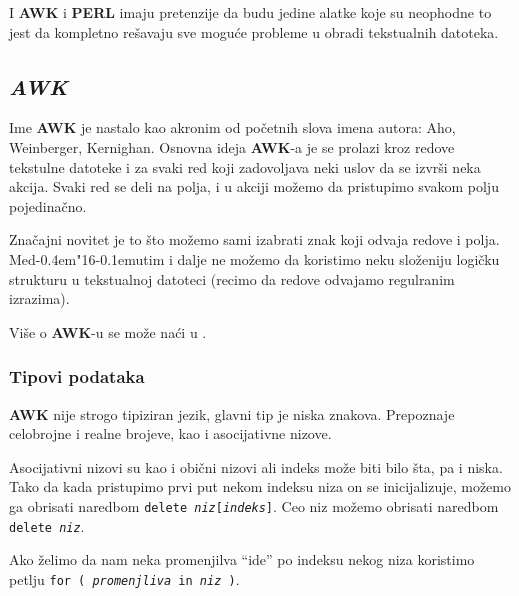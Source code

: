 \documentclass[12pt,a4paper]{article}
\def\d{d\kern-0.4em\char"16\kern-0.1em}
\begin{document}
    I {\bf AWK} i {\bf PERL} imaju pretenzije da budu jedine alatke koje su
    neophodne to jest da kompletno re\v savaju sve mogu\'ce probleme u obradi
    tekstualnih datoteka.
%
    \subsection{\em AWK}
      Ime {\bf AWK} je nastalo kao akronim od po\v cetnih slova imena autora:
      Aho, Weinberger, Kernighan.
      Osnovna ideja {\bf AWK}-a je se prolazi kroz redove tekstulne datoteke i
      za svaki red koji zadovoljava neki uslov da se izvr\v si neka akcija.
      Svaki red se deli na polja, i u akciji mo\v zemo da pristupimo svakom
      polju pojedina\v cno.

      Zna\v cajni novitet je to \v sto mo\v zemo sami izabrati znak koji
      odvaja redove i polja.
      Me\d utim i dalje ne mo\v zemo da koristimo neku slo\v zeniju
      logi\v cku stru\-kturu u tekstualnoj datoteci (recimo da redove odvajamo
      regulranim izrazima).

      Vi\v se o {\bf AWK}-u se mo\v ze na\'ci u \cite{AWK}.
%
      \subsubsection{Tipovi podataka}
        \label{sub:awktipovi}
        {\bf AWK} nije strogo tipiziran jezik, glavni tip je niska znakova.
        Prepoznaje celobrojne i realne brojeve, kao i asocijativne nizove.

        Asocijativni nizovi su kao i obi\v cni nizovi ali indeks mo\v ze biti
        bilo \v sta, pa i niska.
        Tako da kada pristupimo prvi put nekom indeksu niza on se
        inicijalizuje, mo\v zemo ga obrisati naredbom {\tt delete
        {\it niz}[{\it indeks}]}.
        Ceo niz mo\v zemo obrisati naredbom {\tt delete {\it niz}}.

        Ako \v zelimo da nam neka promenjilva ``ide'' po indeksu nekog niza
        kori\-stimo petlju {\tt for ( {\it promenjliva} in {\it niz} )}.
%
\end{document}

